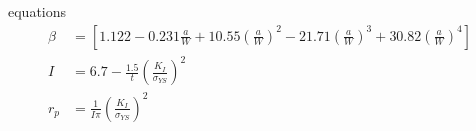 \documentclass[
  letterpaper,
  ignorenonframetext,
  aspectratio=43,
  handout,
  12pt]{beamer}
\begin{document}
\begin{frame}{equations}
\protect\hypertarget{equations}{}
\[\begin{aligned}
  \beta &= \left[1.122 - 0.231 \frac{a}{W} + 10.55 \left(\frac{a}{W}\right)^2 - 21.71 \left(\frac{a}{W}\right)^3 + 30.82 \left(\frac{a}{W}\right)^4\right] \\
  I &= 6.7 - \frac{1.5}{t}\left(\frac{K_I}{\sigma_{YS}}\right)^2 \\
  r_p &= \frac{1}{I\pi} \left(\frac{K_I}{\sigma_{YS}}\right)^2
\end{aligned}\]
\end{frame}
\end{document}
